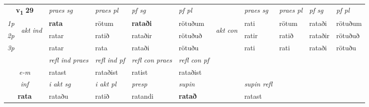 \noindent
\begin{tabular}{lllllllllll} \toprule
\multicolumn{2}{c}{\textbf{v{\textsubscript{1}}} \Large{\textbf{29}}}  &  \textit{praes sg}  & \textit{praes pl}  &\textit{ pf sg} & \textit{pf pl} &  &  \textit{praes sg}  & \textit{praes pl}  & \textit{pf sg} & \textit{pf pl } \\*
	\cmidrule{3-6} \cmidrule{8-11}
 {\textit{1p}} & \multirow{3}{*}{\begin{turn}{90}\textit{akt ind}\end{turn}} & \textbf{rata} & rötum & \textbf{rataði} & rötuðum & \multirow{3}{*}{\begin{turn}{90}\textit{akt con}\end{turn}} &rati & rötum & rataði & rötuðum\\*
 {\textit{2p}} &  &  ratar  & ratið & rataðir & rötuðuð & & ratir & ratið & rataðir & rötuðuð \\*
{\textit{3p}} &  & ratar & rata & rataði & rötuðu & & rati & rati& rataði & rötuðu \\*
\cmidrule{3-6} \cmidrule{8-11}

 & & \textit{refl ind praes} & \textit{refl ind pf} & \textit{refl con praes} & \textit{refl con pf} \\*
 \multicolumn{2}{c}{ \textit{e-m} }& ratast & rataðist & ratist & rataðist \\*

\cmidrule{3-8}
   \multicolumn{2}{c}{\textit{inf}}  & \textit{i akt sg} & \textit{i akt pl}   & \textit{presp} & \textit{supin} && \textit{supin refl}  \\*
  \multicolumn{2}{c}{\textbf{rata}} & rataðu  & ratið   & ratandi &  \textbf{ratað} && ratast  \\*
\end{tabular}

